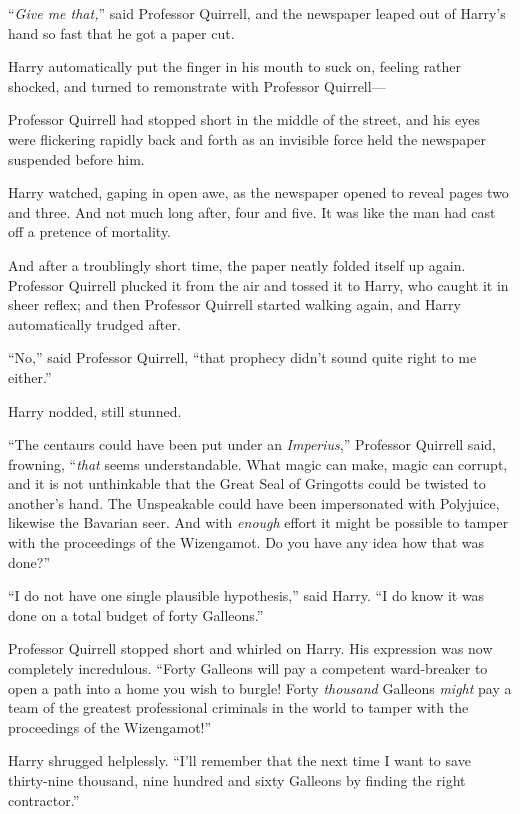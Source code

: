 “\emph{Give me that,}” said Professor Quirrell, and the newspaper leaped out of Harry’s hand so fast that he got a paper cut.

Harry automatically put the finger in his mouth to suck on, feeling rather shocked, and turned to remonstrate with Professor Quirrell—

Professor Quirrell had stopped short in the middle of the street, and his eyes were flickering rapidly back and forth as an invisible force held the newspaper suspended before him.

Harry watched, gaping in open awe, as the newspaper opened to reveal pages two and three. And not much long after, four and five. It was like the man had cast off a pretence of mortality.

And after a troublingly short time, the paper neatly folded itself up again. Professor Quirrell plucked it from the air and tossed it to Harry, who caught it in sheer reflex; and then Professor Quirrell started walking again, and Harry automatically trudged after.

“No,” said Professor Quirrell, “that prophecy didn’t sound quite right to me either.”

Harry nodded, still stunned.

“The centaurs could have been put under an \emph{Imperius},” Professor Quirrell said, frowning, “\emph{that} seems understandable. What magic can make, magic can corrupt, and it is not unthinkable that the Great Seal of Gringotts could be twisted to another’s hand. The Unspeakable could have been impersonated with Polyjuice, likewise the Bavarian seer. And with \emph{enough} effort it might be possible to tamper with the proceedings of the Wizengamot. Do you have any idea how that was done?”

“I do not have one single plausible hypothesis,” said Harry.
“I do know it was done on a total budget of forty Galleons.”

Professor Quirrell stopped short and whirled on Harry. His expression was now completely incredulous.
“Forty Galleons will pay a competent ward-breaker to open a path into a home you wish to burgle! Forty \emph{thousand} Galleons \emph{might} pay a team of the greatest professional criminals in the world to tamper with the proceedings of the Wizengamot!”

Harry shrugged helplessly.
“I’ll remember that the next time I want to save thirty-nine thousand, nine hundred and sixty Galleons by finding the right contractor.”

